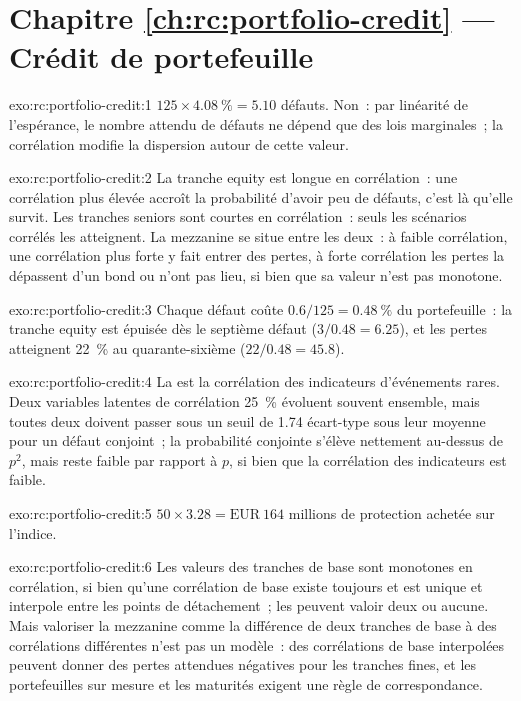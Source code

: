 \section*{Chapitre \ref{ch:rc:portfolio-credit} --- Crédit de portefeuille}

\begin{solution}{exo:rc:portfolio-credit:1}
$125\times4.08~\% = 5.10$ défauts. Non~: par linéarité de l'espérance, le nombre attendu de
défauts ne dépend que des lois marginales~; la corrélation modifie la dispersion autour de cette valeur.
\end{solution}

\begin{solution}{exo:rc:portfolio-credit:2}
La tranche equity est longue en corrélation~: une corrélation plus élevée accroît la probabilité d'avoir peu
de défauts, c'est là qu'elle survit. Les tranches seniors sont courtes en corrélation~: seuls
les scénarios corrélés les atteignent. La mezzanine se situe entre les deux~: à faible corrélation, une
corrélation plus forte y fait entrer des pertes, à forte corrélation les pertes la dépassent d'un bond ou n'ont pas lieu,
si bien que sa valeur n'est pas monotone.
\end{solution}

\begin{solution}{exo:rc:portfolio-credit:3}
Chaque défaut coûte $0.6/125 = 0.48~\%$ du portefeuille~: la tranche equity est épuisée dès le septième
défaut ($3/0.48 = 6.25$), et les pertes atteignent 22~\% au quarante-sixième ($22/0.48 = 45.8$).
\end{solution}

\begin{solution}{exo:rc:portfolio-credit:4}
La  est la corrélation des indicateurs d'événements rares. Deux variables latentes
de corrélation 25~\% évoluent souvent ensemble, mais toutes deux doivent passer sous un seuil de 1.74
écart-type sous leur moyenne pour un défaut conjoint~; la probabilité conjointe s'élève nettement au-dessus de
$p^2$, mais reste faible par rapport à $p$, si bien que la corrélation des indicateurs est faible.
\end{solution}

\begin{solution}{exo:rc:portfolio-credit:5}
$50\times3.28 = \text{EUR}~164$ millions de protection achetée sur l'indice.
\end{solution}

\begin{solution}{exo:rc:portfolio-credit:6}
Les valeurs des tranches de base sont monotones en corrélation, si bien qu'une corrélation de base existe toujours et
est unique et interpole entre les points de détachement~; les  peuvent valoir deux ou
aucune. Mais valoriser la mezzanine comme la différence de deux tranches de base à des
corrélations différentes n'est pas un modèle~: des corrélations de base interpolées peuvent donner des pertes attendues
négatives pour les tranches fines, et les portefeuilles sur mesure et les maturités exigent une règle de correspondance.
\end{solution}

